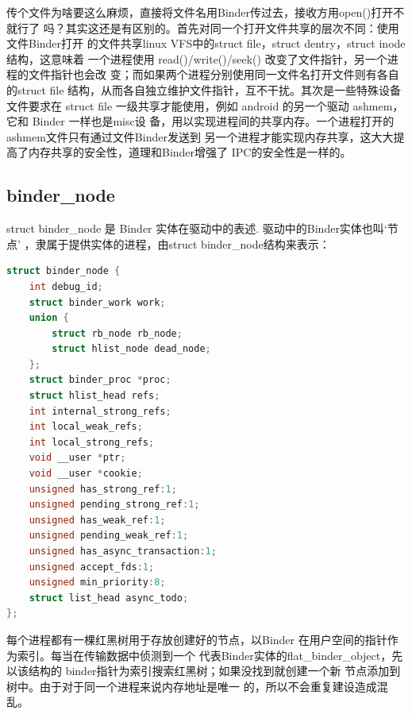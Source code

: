 \documentclass[a4paper,11pt]{article}
\begin{document}
传个文件为啥要这么麻烦，直接将文件名用Binder传过去，接收方用open()打开不就行了
吗？其实这还是有区别的。首先对同一个打开文件共享的层次不同：使用文件Binder打开
的文件共享linux VFS中的struct file，struct dentry，struct inode结构，这意味着
一个进程使用 read()/write()/seek() 改变了文件指针，另一个进程的文件指针也会改
变；而如果两个进程分别使用同一文件名打开文件则有各自的struct file
结构，从而各自独立维护文件指针，互不干扰。其次是一些特殊设备文件要求在
struct file 一级共享才能使用，例如 android 的另一个驱动 ashmem，它和 Binder 一样也是misc设
备，用以实现进程间的共享内存。一个进程打开的ashmem文件只有通过文件Binder发送到
另一个进程才能实现内存共享，这大大提高了内存共享的安全性，道理和Binder增强了
IPC的安全性是一样的。

\fi


\subsection{binder_node}
struct binder_node 是 Binder 实体在驱动中的表述. 驱动中的Binder实体也叫‘节点’
，隶属于提供实体的进程，由struct binder_node结构来表示：
\begin{lstlisting}[language=C,multicols=2,xleftmargin=3pt, label=BinderNode]
struct binder_node {
    int debug_id;
    struct binder_work work;
    union {
        struct rb_node rb_node;
        struct hlist_node dead_node;
    };
    struct binder_proc *proc;
    struct hlist_head refs;
    int internal_strong_refs;
    int local_weak_refs;
    int local_strong_refs;
    void __user *ptr;
    void __user *cookie;
    unsigned has_strong_ref:1;
    unsigned pending_strong_ref:1;
    unsigned has_weak_ref:1;
    unsigned pending_weak_ref:1;
    unsigned has_async_transaction:1;
    unsigned accept_fds:1;
    unsigned min_priority:8;
    struct list_head async_todo;
};
\end{lstlisting}

    每个进程都有一棵红黑树用于存放创建好的节点，以Binder
    在用户空间的指针作为索引。每当在传输数据中侦测到一个
    代表Binder实体的flat_binder_object，先以该结构的
    binder指针为索引搜索红黑树；如果没找到就创建一个新
    节点添加到树中。由于对于同一个进程来说内存地址是唯一
    的，所以不会重复建设造成混乱。
\end{document}
